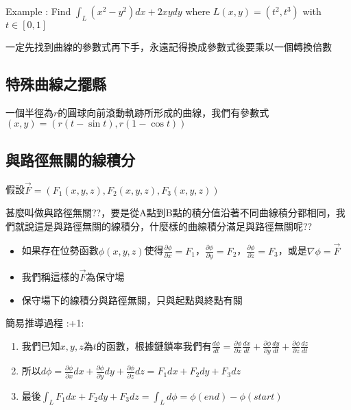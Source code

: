 \documentclass[
]{book}
\providecommand{\tightlist}{%
  \setlength{\itemsep}{0pt}\setlength{\parskip}{0pt}}
\begin{document}
Example : Find \(\int_L(x^2 - y^2)dx+2xydy\) where \(L(x,y) = (t^2, t^3)\) with \(t \in [0,1]\)

一定先找到曲線的參數式再下手，永遠記得換成參數式後要乘以一個轉換倍數

\hypertarget{ux7279ux6b8aux66f2ux7ddaux4e4bux64faux7e23}{%
\subsection{特殊曲線之擺縣}\label{ux7279ux6b8aux66f2ux7ddaux4e4bux64faux7e23}}

一個半徑為\(r\)的圓球向前滾動軌跡所形成的曲線，我們有參數式\((x,y) = (r(t-\sin t), r(1-\cos t))\)

\hypertarget{ux8207ux8defux5f91ux7121ux95dcux7684ux7ddaux7a4dux5206}{%
\subsection{與路徑無關的線積分}\label{ux8207ux8defux5f91ux7121ux95dcux7684ux7ddaux7a4dux5206}}

假設\(\vec F = (F_1(x,y,z), F_2(x,y,z), F_3(x,y,z))\)

甚麼叫做與路徑無關??，要是從A點到B點的積分值沿著不同曲線積分都相同，我們就說這是與路徑無關的線積分，什麼樣的曲線積分滿足與路徑無關呢??

\begin{itemize}
\tightlist
\item
  如果存在位勢函數\(\phi(x,y,z)\)使得\(\frac{\partial\phi}{\partial x} = F_1\)，\(\frac{\partial\phi}{\partial y} = F_2\)，\(\frac{\partial\phi}{\partial z} = F_3\)，或是\(\nabla\phi = \vec F\)
\item
  我們稱這樣的\(\vec F\)為保守場
\item
  保守場下的線積分與路徑無關，只與起點與終點有關
\end{itemize}

簡易推導過程 :+1:

\begin{enumerate}
\def\labelenumi{\arabic{enumi}.}
\tightlist
\item
  我們已知\(x,y,z\)為\(t\)的函數，根據鏈鎖率我們有\(\frac{d \phi}{dt} = \frac{\partial \phi}{\partial x}\frac{dx}{dt}+\frac{\partial \phi}{\partial y}\frac{dy}{dt}+\frac{\partial \phi}{\partial z}\frac{dz}{dt}\)
\item
  所以\(d\phi = \frac{\partial \phi}{\partial x}dx + \frac{\partial \phi}{\partial y}dy + \frac{\partial \phi}{\partial z}dz = F_1dx + F_2dy + F_3dz\)
\item
  最後\(\int_LF_1dx + F_2dy + F_3dz = \int_Ld\phi = \phi(end) - \phi(start)\)
\end{enumerate}
\end{document}
